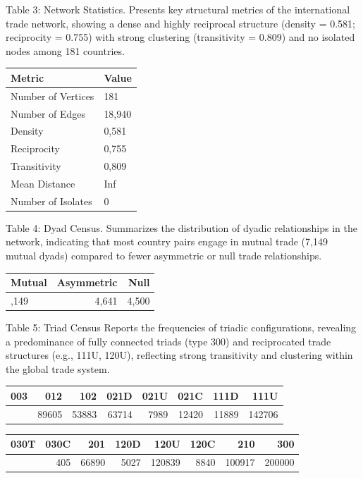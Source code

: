 \documentclass[
]{article}
\begin{document}
Table 3: Network Statistics. Presents key structural metrics of the
international trade network, showing a dense and highly reciprocal
structure (density = 0.581; reciprocity = 0.755) with strong clustering
(transitivity = 0.809) and no isolated nodes among 181 countries.

\begin{longtable}[]{@{}ll@{}}
\toprule\noalign{}
Metric & Value \\
\midrule\noalign{}
\endhead
\bottomrule\noalign{}
\endlastfoot
Number of Vertices & 181 \\
Number of Edges & 18,940 \\
Density & 0,581 \\
Reciprocity & 0,755 \\
Transitivity & 0,809 \\
Mean Distance & Inf \\
Number of Isolates & 0 \\
\end{longtable}

Table 4: Dyad Census. Summarizes the distribution of dyadic
relationships in the network, indicating that most country pairs engage
in mutual trade (7,149 mutual dyads) compared to fewer asymmetric or
null trade relationships.

\begin{longtable}[]{@{}lrr@{}}
\toprule\noalign{}
Mutual & Asymmetric & Null \\
\midrule\noalign{}
\endhead
\bottomrule\noalign{}
\endlastfoot
7,149 & 4,641 & 4,500 \\
\end{longtable}

Table 5: Triad Census Reports the frequencies of triadic configurations,
revealing a predominance of fully connected triads (type 300) and
reciprocated trade structures (e.g., 111U, 120U), reflecting strong
transitivity and clustering within the global trade system.

\begin{longtable}[]{@{}rrrrrrrr@{}}
\toprule\noalign{}
003 & 012 & 102 & 021D & 021U & 021C & 111D & 111U \\
\midrule\noalign{}
\endhead
\bottomrule\noalign{}
\endlastfoot
70972 & 89605 & 53883 & 63714 & 7989 & 12420 & 11889 & 142706 \\
\end{longtable}

\begin{longtable}[]{@{}rrrrrrrr@{}}
\toprule\noalign{}
030T & 030C & 201 & 120D & 120U & 120C & 210 & 300 \\
\midrule\noalign{}
\endhead
\bottomrule\noalign{}
\endlastfoot
15583 & 405 & 66890 & 5027 & 120839 & 8840 & 100917 & 200000 \\
\end{longtable}
\end{document}
